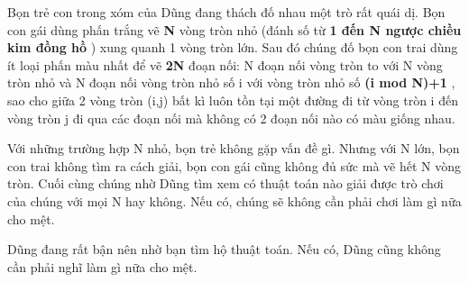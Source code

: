 Bọn trẻ con trong xóm của Dũng đang thách đố nhau một trò rất quái dị. Bọn con gái dùng phấn trắng vẽ   \textbf{    N   }   vòng tròn nhỏ (đánh số từ   \textbf{    1 đến N ngược chiều kim đồng hồ   }   ) xung quanh 1 vòng tròn lớn. Sau đó chúng đố bọn con trai dùng ít loại phấn màu nhất để vẽ   \textbf{    2N   }   đoạn nối: N đoạn nối vòng tròn to với N vòng tròn nhỏ và N đoạn nối vòng tròn nhỏ số i với vòng tròn nhỏ số   \textbf{    (i mod N)+1   }   , sao cho giữa 2 vòng tròn (i,j) bất kì luôn tồn tại một đường đi từ vòng tròn i đến vòng tròn j đi qua các đoạn nối mà không có 2 đoạn nối nào có màu giống nhau.  

   Với những trường hợp N nhỏ, bọn trẻ không gặp vấn đề gì. Nhưng với N lớn, bọn con trai không tìm ra cách giải, bọn con gái cũng không đủ sức mà vẽ hết N vòng tròn. Cuối cùng chúng nhờ Dũng tìm xem có thuật toán nào giải được trò chơi của chúng với mọi N hay không. Nếu có, chúng sẽ không cần phải chơi làm gì nữa cho mệt.  

   Dũng đang rất bận nên nhờ bạn tìm hộ thuật toán. Nếu có, Dũng cũng không cần phải nghĩ làm gì nữa cho mệt.